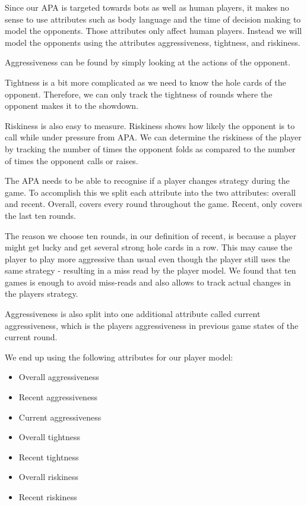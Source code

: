 Since our APA is targeted towards bots as well as human players, it makes no sense to use attributes such as body language and the time of decision making to model the opponents. Those attributes only affect human players. Instead we will model the opponents using the attributes aggressiveness, tightness, and riskiness.

Aggressiveness can be found by simply looking at the actions of the opponent. 

Tightness is a bit more complicated as we need to know the hole cards of the opponent. Therefore, we can only track the tightness of rounds where the opponent makes it to the showdown.

Riskiness is also easy to measure. Riskiness shows how likely the opponent is to call while under pressure from APA. We can determine the riskiness of the player by tracking the number of times the opponent folds as compared to the number of times the opponent calls or raises.

The APA needs to be able to recognise if a player changes strategy during the game. To accomplish this we split each attribute into the two attributes: overall and recent. Overall, covers every round throughout the game. Recent, only covers the last ten rounds.

The reason we choose ten rounds, in our definition of recent, is because a player might get lucky and get several strong hole cards in a row. This may cause the player to play more aggressive than usual even though the player still uses the same strategy - resulting in a miss read by the player model. We found that ten games is enough to avoid miss-reads and also allows to track actual changes in the players strategy.

Aggressiveness is also split into one additional attribute called current aggressiveness, which is the players aggressiveness in previous game states of the current round.

We end up using the following attributes for our player model:
\begin{itemize}
\item Overall aggressiveness
\item Recent aggressiveness
\item Current aggressiveness
\item Overall tightness
\item Recent tightness
\item Overall riskiness
\item Recent riskiness
\end{itemize}

